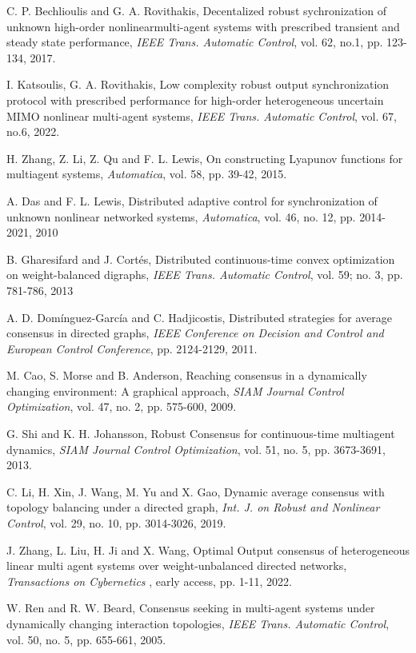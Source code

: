 \documentclass[journal,twoside]{IEEEtran}
\def\TAC{{\it IEEE Trans. Automat. Contr.}}
\def\AUT{{\it Automatica}}
\def\IJRNLC{{\it Int. J. on Robust and Nonlinear Control}}
\def\TAC{{\it IEEE Trans. Automatic Control}}
\def\AUT{{\it Automatica}}
\begin{document}
\begin{thebibliography}{00}
C. P. Bechlioulis and G. A. Rovithakis, Decentalized robust sychronization of unknown high-order nonlinearmulti-agent systems with prescribed transient and steady state performance, \TAC, vol. 62, no.1, pp. 123-134, 2017.

I. Katsoulis, G. A. Rovithakis, Low complexity robust output synchronization protocol with prescribed performance for high-order heterogeneous uncertain MIMO nonlinear multi-agent systems, \TAC, vol. 67, no.6, 2022.


H. Zhang, Z. Li, Z. Qu and F. L. Lewis, On constructing Lyapunov functions for multiagent systems, \AUT, vol. 58, pp. 39-42, 2015.

A. Das and F. L. Lewis, Distributed adaptive control for synchronization of unknown nonlinear networked systems, \AUT, vol. 46, no. 12, pp. 2014-2021, 2010


B. Gharesifard and J. Cort\'es,  Distributed continuous-time convex optimization on weight-balanced digraphs, \TAC, vol. 59; no. 3, pp. 781-786, 2013


A. D. Dom\'inguez-Garc\'ia and C. Hadjicostis, Distributed strategies for average consensus in directed graphs, {\it IEEE Conference on Decision and Control and European Control Conference}, pp. 2124-2129, 2011.

M. Cao, S. Morse and B. Anderson, Reaching consensus in a dynamically changing environment: A graphical approach, {\it SIAM Journal Control Optimization}, vol. 47, no. 2, pp. 575-600, 2009.

G. Shi and K. H. Johansson, Robust Consensus for continuous-time multiagent dynamics, {\it SIAM Journal Control Optimization}, vol. 51, no. 5, pp. 3673-3691, 2013.

C. Li, H. Xin, J. Wang, M. Yu and X. Gao, Dynamic average consensus with topology balancing under a directed graph, {\IJRNLC}, vol. 29, no. 10, pp. 3014-3026, 2019.

J. Zhang, L. Liu, H. Ji and X. Wang, Optimal Output consensus of heterogeneous linear multi agent systems over weight-unbalanced directed networks, {\it Transactions on Cybernetics }, early access, pp. 1-11, 2022. 

W. Ren and R. W. Beard, Consensus seeking in multi-agent systems
under dynamically changing interaction topologies, \TAC, vol. 50, no. 5, pp. 655-661, 2005. 


\end{thebibliography}
\end{document}
